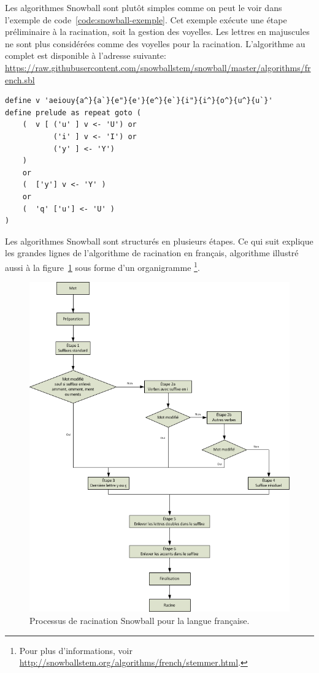 Les algorithmes Snowball sont plut\^ot simples comme on peut le voir dans l'exemple de code~\ref{code:snowball-exemple}.
Cet exemple ex\'ecute une \'etape pr\'eliminaire \`a la racination, soit la gestion des voyelles.
Les lettres en majuscules ne sont plus consid\'er\'ees comme des voyelles pour la racination.
L'algorithme au complet est disponible \`a l'adresse suivante: \url{https://raw.githubusercontent.com/snowballstem/snowball/master/algorithms/french.sbl}
\begin{lstfloat}
\begin{lstlisting}[frame=l]
define v 'aeiouy{a^}{a`}{e"}{e'}{e^}{e`}{i"}{i^}{o^}{u^}{u`}'
define prelude as repeat goto (
    (  v [ ('u' ] v <- 'U') or
           ('i' ] v <- 'I') or
           ('y' ] <- 'Y')
    )
    or
    (  ['y'] v <- 'Y' )
    or
    (  'q' ['u'] <- 'U' )
)
\end{lstlisting}
\caption{Exemple de l'algorithme de racination en fran\c{c}ais en Snowball.}
\label{code:snowball-exemple}
\end{lstfloat}

Les algorithmes Snowball sont structur\'es en plusieurs \'etapes.
Ce qui suit explique les grandes lignes de l'algorithme de racination en fran\c{c}ais, algorithme illustr\'e aussi \`a la figure~\ref{snowball-process} sous forme d'un organigramme%
\footnote{Pour plus d'informations, voir \url{http://snowballstem.org/algorithms/french/stemmer.html}.}.

\begin{figure}[h!]
  \includegraphics[scale=0.85]{images/snowball.png}
  \caption{Processus de racination Snowball pour la langue fran\c{c}aise.}
  \label{snowball-process}
\end{figure}

